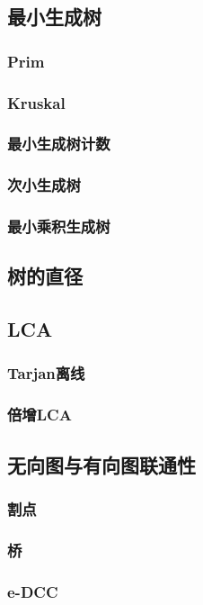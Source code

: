\documentclass[twocolumn,a4]{article}
\newcommand{\addcpp}[1]{}
\begin{document}
	\subsection{最小生成树}
		\subsubsection{Prim}
		\subsubsection{Kruskal}
		\subsubsection{最小生成树计数}
		\subsubsection{次小生成树}
		\subsubsection{最小乘积生成树}
	\subsection{树的直径}
	\subsection{LCA}
		\subsubsection{Tarjan离线}
		\subsubsection{倍增LCA}
			\addcpp{datastruct/da_lca}
	\subsection{无向图与有向图联通性}
		\subsubsection{割点}
		\subsubsection{桥}
		\subsubsection{e-DCC}
\end{document}
